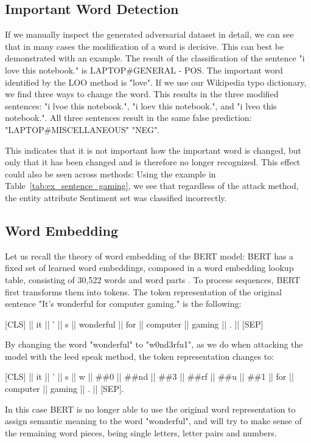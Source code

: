 \subsection{Important Word Detection}

If we manually inspect the generated adversarial dataset in detail, we can see that in many cases the modification of a word is decisive. This can best be demonstrated with an example. 
The result of the classification of the sentence "i love this notebook." is LAPTOP\#GENERAL - POS. The important word identified by the LOO method is "love". If we use our Wikipedia typo dictionary, we find three ways to change the word. This results in the three modified sentences: "i lvoe this notebook.", "i loev this notebook.", and "i lveo this notebook.".
All three sentences result in the same false prediction:
"LAPTOP\#MISCELLANEOUS" "NEG".

This indicates that it is not important how the important word is changed, but only that it has been changed and is therefore no longer recognized. This effect could also be seen across methods: 
Using the example in Table~\ref{tab:ex_sentence_gaming}, we see that regardless of the attack method, the entity attribute Sentiment set was classified incorrectly. 


\subsection{Word Embedding}
Let us recall the theory of word embedding of the BERT model:
BERT has a fixed set of learned word embeddings, composed in a word embedding lookup table, consisting of 30,522 words and word parts \cite{devlin2018bert}. To process sequences, BERT first transforms them into tokens. The token representation of the original sentence "It’s wonderful for computer gaming." is the following:


{[}CLS{]}  ||  it  ||  '  ||  s  ||  wonderful  ||  for  ||  computer  ||  gaming  ||  .  ||  {[}SEP{]} 


By changing the word "wonderful" to "w0nd3rfu1", as we do when attacking the model with the leed speak method, the token representation changes to:

{[}CLS{]}  ||  it  ||  '  ||  s  ||  w  ||  \#\#0  ||  \#\#nd  ||  \#\#3  ||  \#\#rf  ||  \#\#u  ||  \#\#1  ||  for  ||  computer  ||  gaming  ||  .  ||  {[}SEP{]}.

In this case BERT is no longer able to use the original word representation to assign semantic meaning to the word "wonderful", and will try to make sense of the remaining word pieces, being single letters, letter pairs and numbers.

